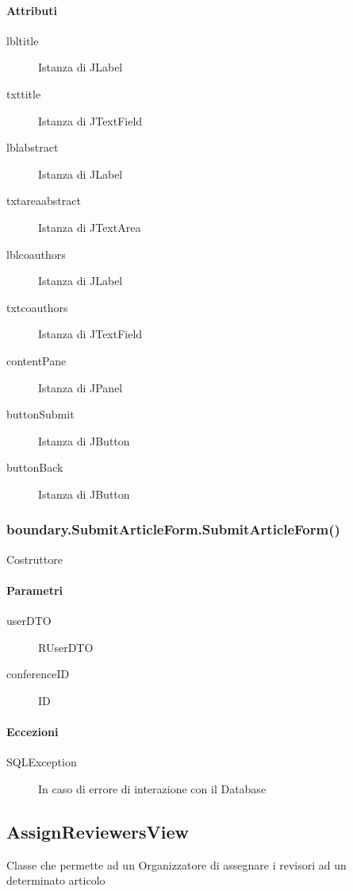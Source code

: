 \paragraph{Attributi}
\begin{description}
\item[lbltitle] Istanza di JLabel
\item[txttitle] Istanza di JTextField
\item[lblabstract] Istanza di JLabel
\item[txtareaabstract] Istanza di JTextArea
\item[lblcoauthors] Istanza di JLabel
\item[txtcoauthors] Istanza di JTextField
\item[contentPane] Istanza di JPanel
\item[buttonSubmit] Istanza di JButton
\item[buttonBack] Istanza di JButton
\end{description}

\subsubsection{boundary.SubmitArticleForm.SubmitArticleForm()}
Costruttore
\paragraph{Parametri}
\begin{description}
\item[userDTO] RUserDTO
\item[conferenceID] ID
\end{description}
\paragraph{Eccezioni}
\begin{description}
\item[SQLException] In caso di errore di interazione con il Database
\end{description}
\subsection{AssignReviewersView}
Classe che permette ad un Organizzatore di assegnare i revisori ad un determinato articolo
